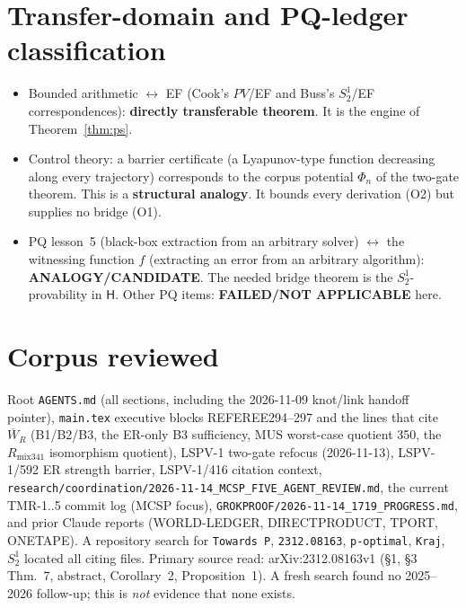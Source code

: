 \documentclass[11pt]{article}
\theoremstyle{definition}
\newcommand{\Wbar}{\overline W}
\begin{document}
\section{Transfer-domain and PQ-ledger classification}
\begin{itemize}
\item Bounded arithmetic $\leftrightarrow$ EF (Cook's $PV$/EF and Buss's $S^1_2$/EF
correspondences): \textbf{directly transferable theorem}. It is the engine of
Theorem~\ref{thm:ps}.
\item Control theory: a barrier certificate (a Lyapunov-type function decreasing along every
trajectory) corresponds to the corpus potential $\Phi_n$ of the two-gate theorem. This is a
\textbf{structural analogy}. It bounds every derivation (O2) but supplies no bridge (O1).
\item PQ lesson~5 (black-box extraction from an arbitrary solver) $\leftrightarrow$ the
witnessing function $f$ (extracting an error from an arbitrary algorithm):
\textbf{ANALOGY/CANDIDATE}. The needed bridge theorem is the $S^1_2$-provability in
$\mathsf H$. Other PQ items: \textbf{FAILED/NOT APPLICABLE} here.
\end{itemize}

\section{Corpus reviewed}
Root \texttt{AGENTS.md} (all sections, including the 2026-11-09 knot/link handoff pointer),
\texttt{main.tex} executive blocks REFEREE294--297 and the lines that cite $\Wbar_R$ (B1/B2/B3,
the ER-only B3 sufficiency, MUS worst-case quotient 350, the $R_{\mathrm{mix341}}$ isomorphism
quotient), LSPV-1 two-gate refocus (2026-11-13), LSPV-1/592 ER strength barrier, LSPV-1/416
citation context, \texttt{research/coordination/2026-11-14\_MCSP\_FIVE\_AGENT\_REVIEW.md}, the
current TMR-1..5 commit log (MCSP focus), \texttt{GROKPROOF/2026-11-14\_1719\_PROGRESS.md}, and
prior Claude reports (WORLD-LEDGER, DIRECTPRODUCT, TPORT, ONETAPE). A repository search for
\texttt{Towards P}, \texttt{2312.08163}, \texttt{p-optimal}, \texttt{Kraj}, $S^1_2$ located
all citing files. Primary source read: arXiv:2312.08163v1 (\S1, \S3 Thm.~7, abstract,
Corollary~2, Proposition~1). A fresh search found no 2025--2026 follow-up; this is
\emph{not} evidence that none exists.
\end{document}
